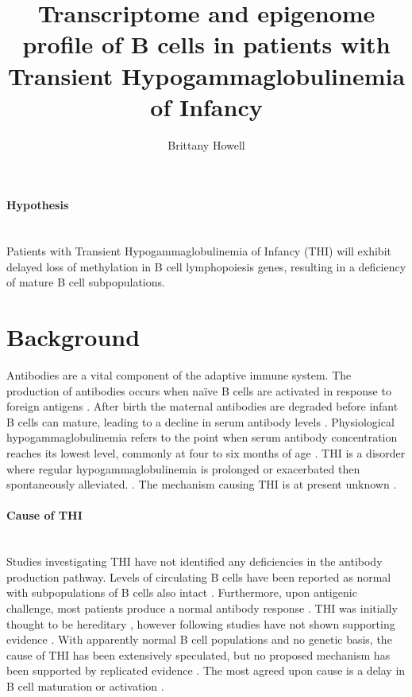 \documentclass[12pt]{article}
\title{\vspace{-2cm} Transcriptome and epigenome profile of B cells in patients with Transient Hypogammaglobulinemia of Infancy}
\date{}
\author{Brittany Howell}
\newcommand{\naive}{na\"{i}ve }
\begin{document}
	\maketitle
	
	\paragraph{Hypothesis}
	~\\
	Patients with Transient Hypogammaglobulinemia of Infancy (THI) will exhibit delayed loss of methylation in B cell lymphopoiesis genes, resulting in a deficiency of mature B cell subpopulations.
	
	\section{Background}
		
		Antibodies are a vital component of the adaptive immune system. 
		The production of antibodies occurs when \naive B cells are activated in response to foreign antigens \citep{Simon15}.
		After birth the maternal antibodies are degraded before infant B cells can mature, leading to a decline in serum antibody levels \citep{Hasselquist09,Martin10,Rechavi15}.
		Physiological hypogammaglobulinemia refers to the point when serum antibody concentration reaches its lowest level, commonly at four to six months of age \citep{Dressler89}.
		THI is a disorder where regular hypogammaglobulinemia is prolonged or exacerbated then spontaneously alleviated. \citep{Dressler89,AlHerz14,Gitlin56,AlHerz11,Rosen66,McGeady87,Stiemh80, Dalal98,Tiller78,Buckley83}.
		The mechanism causing THI is at present unknown \citep{AlHerz14}. 

			
		\paragraph{Cause of THI} 
			~\\
			Studies investigating THI have not identified any deficiencies in the antibody production pathway.
			Levels of circulating B cells have been reported as normal with subpopulations of B cells also intact \citep{Tiller78,Stiemh80,Siegel81,Buckley83,Fiorilli86,Dressler89}.
			Furthermore, upon antigenic challenge, most patients produce a normal antibody response \citep{Tiller78,Stiemh80,Buckley83,McGeady87,Dressler89,Dalal98}.
			THI was initially thought to be hereditary \citep{Willenbockel60, Soothill68}, however following studies have not shown supporting evidence \citep{Tiller78,Fiorilli86,Ovadia14}.
			With apparently normal B cell populations and no genetic basis, the cause of THI has been extensively speculated, but no proposed mechanism has been supported by replicated evidence \citep{Fudenberg64,Rosen66,Nathenson71,Willenbockel60,Soothill68,Tiller78,Fiorilli86,Ovadia14,Siegel81,McGeady87}.
			The most agreed upon cause is a delay in B cell maturation or activation \citep{McGeady87,Stiemh80,Walker94,Rosen84}. 
			
\end{document}
